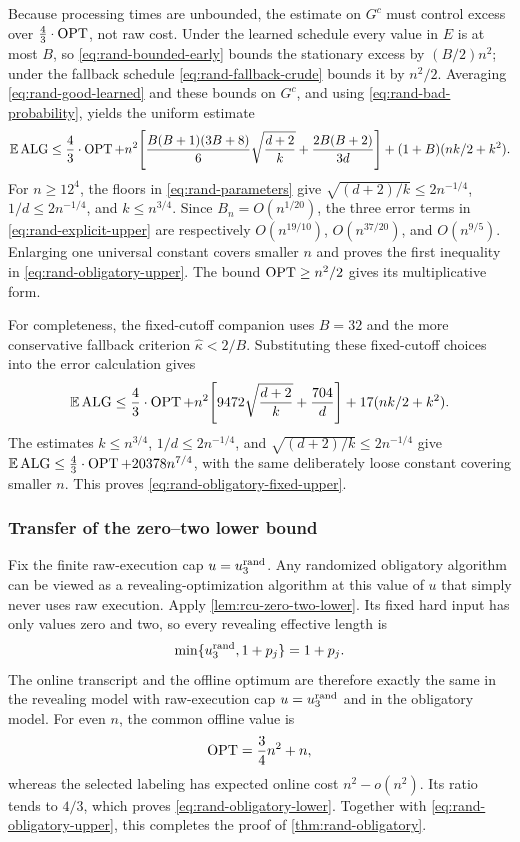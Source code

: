 Because processing times are unbounded, the estimate on $G^c$ must control
excess over $\frac43\cdot\operatorname{OPT}$, not raw cost.  Under the learned schedule
every value in $E$ is at most $B$, so \cref{eq:rand-bounded-early} bounds the
stationary excess by $(B/2)n^2$; under the fallback schedule
\cref{eq:rand-fallback-crude} bounds it by
$n^2/2$.  Averaging \cref{eq:rand-good-learned} and these bounds on $G^c$,
and using \cref{eq:rand-bad-probability}, yields the uniform estimate
\begin{equation}
 \mathbb{E}\operatorname{ALG}
 \le\frac43\cdot\operatorname{OPT}
 +n^2\!\left[
   \frac{B(B+1)(3B+8)}6\sqrt{\frac{d+2}{k}}
   +\frac{2B(B+2)}{3d}\right]
 +(1+B)(nk/2+k^2).
 \label{eq:rand-explicit-upper}
\end{equation}
For $n\ge12^4$, the floors in \cref{eq:rand-parameters} give
$\sqrt{(d+2)/k}\le2n^{-1/4}$, $1/d\le2n^{-1/4}$, and
$k\le n^{3/4}$.  Since $B_n=O(n^{1/20})$, the three error terms in
\cref{eq:rand-explicit-upper} are respectively
$O(n^{19/10})$, $O(n^{37/20})$, and $O(n^{9/5})$.  Enlarging one universal
constant covers smaller $n$ and proves the first inequality in
\cref{eq:rand-obligatory-upper}.  The bound $\operatorname{OPT}\ge n^2/2$ gives its
multiplicative form.

For completeness, the fixed-cutoff companion uses $B=32$ and the more
conservative fallback criterion $\widehat\kappa<2/B$.  Substituting these
fixed-cutoff choices into the error calculation gives
\[
 \mathbb{E}\operatorname{ALG}
 \le\frac43\cdot\operatorname{OPT}
 +n^2\!\left[9472\sqrt{\frac{d+2}{k}}+\frac{704}{d}\right]
 +17(nk/2+k^2).
\]
The estimates $k\le n^{3/4}$, $1/d\le2n^{-1/4}$, and
$\sqrt{(d+2)/k}\le2n^{-1/4}$ give
$\mathbb{E}\operatorname{ALG}\le\frac43\cdot\operatorname{OPT}+20378n^{7/4}$, with the same deliberately loose
constant covering smaller $n$.  This proves
\cref{eq:rand-obligatory-fixed-upper}.

\subsubsection{Transfer of the zero--two lower bound}

Fix the finite raw-execution cap $u=u_{3}^{\mathrm{rand}}$.  Any randomized obligatory
algorithm can be viewed as a revealing-optimization algorithm at this value
of $u$ that simply never uses raw execution.  Apply
\cref{lem:rcu-zero-two-lower}.  Its fixed hard
input has only values zero and two, so every revealing effective length is
\[
 \min\{u_{3}^{\mathrm{rand}},1+p_j\}=1+p_j.
\]
The online transcript and the offline optimum are therefore exactly the
same in the revealing model with raw-execution cap $u=u_{3}^{\mathrm{rand}}$ and in the
obligatory model.  For even $n$, the common
offline value is
\[
 \operatorname{OPT}=\frac34n^2+n,
\]
whereas the selected labeling has expected online cost
$n^2-o(n^2)$.  Its ratio tends to $4/3$, which proves
\cref{eq:rand-obligatory-lower}.  Together with
\cref{eq:rand-obligatory-upper}, this completes the proof of
\cref{thm:rand-obligatory}.
